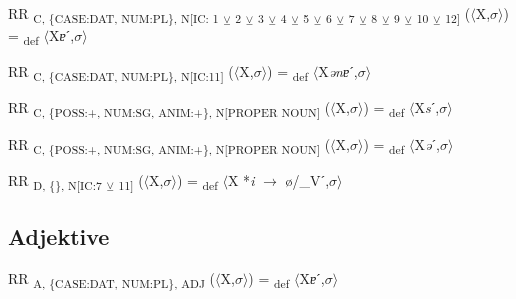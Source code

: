 {\begin{exe}
 RR \textsubscript{C, \{CASE:DAT, NUM:PL\}, N[IC: 1} \textsubscript{${\veebar}$}\textsubscript{ 2} \textsubscript{${\veebar}$}\textsubscript{ 3} \textsubscript{${\veebar}$}\textsubscript{ 4} \textsubscript{${\veebar}$}\textsubscript{ 5} \textsubscript{${\veebar}$}\textsubscript{ 6} \textsubscript{${\veebar}$}\textsubscript{ 7} \textsubscript{${\veebar}$}\textsubscript{ 8} \textsubscript{${\veebar}$}\textsubscript{ 9} \textsubscript{${\veebar}$}\textsubscript{ 10} \textsubscript{${\veebar}$}\textsubscript{ 12]} ($\langle$X,$\sigma $$\rangle$) = \textsubscript{def} $\langle$X\textit{ɐ}ˊ,$\sigma $$\rangle$
\end{exe}

\begin{exe}
 RR \textsubscript{C, \{CASE:DAT, NUM:PL\}, N[IC:11]} ($\langle$X,$\sigma $$\rangle$) = \textsubscript{def} $\langle$X\textit{ənɐ}ˊ,$\sigma $$\rangle$
\end{exe}

\begin{exe}
 RR \textsubscript{C, \{POSS:+, NUM:SG, ANIM:+\}, N[}\textsubscript{PROPER NOUN}\textsubscript{]} ($\langle$X,$\sigma $$\rangle$) = \textsubscript{def} $\langle$X\textit{s}ˊ,$\sigma $$\rangle$
\end{exe}

\begin{exe}
 RR \textsubscript{C, \{POSS:+, NUM:SG, ANIM:+\}, N[}\textsubscript{PROPER NOUN}\textsubscript{]} ($\langle$X,$\sigma $$\rangle$) = \textsubscript{def} $\langle$X\textit{ə}ˊ,$\sigma $$\rangle$
\end{exe}

\begin{exe}
 RR \textsubscript{D, \{\}, N[IC:7} \textsubscript{${\veebar}$}\textsubscript{ 11]} ($\langle$X,$\sigma $$\rangle$) = \textsubscript{def} $\langle$X *\textit{i} $\rightarrow$ ø/\_Vˊ,$\sigma $$\rangle$
\end{exe}

\subsection{Adjektive}

\begin{exe}
 RR \textsubscript{A, \{CASE:DAT, NUM:PL\}, ADJ} ($\langle$X,$\sigma $$\rangle$) = \textsubscript{def} $\langle$X\textit{ɐ}ˊ,$\sigma $$\rangle$
\end{exe}

}
